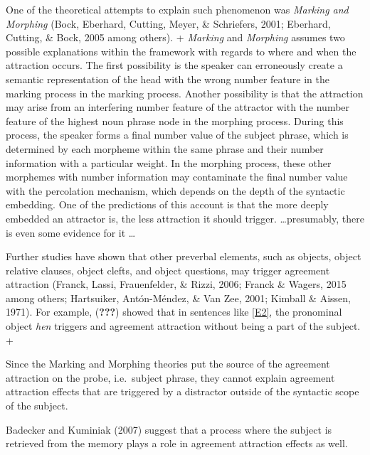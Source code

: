 \documentclass[english,doc]{apa6}
\begin{document}
One of the theoretical attempts to explain such phenomenon was \emph{Marking and Morphing} (Bock, Eberhard, Cutting, Meyer, \& Schriefers, 2001; Eberhard, Cutting, \& Bock, 2005 among others).
+
\emph{Marking} and \emph{Morphing} assumes two possible explanations within the framework with regards to where and when the attraction occurs. The first possibility is the speaker can erroneously create a semantic representation of the head with the wrong number feature in the marking process in the marking process. Another possibility is that the attraction may arise from an interfering number feature of the attractor with the number feature of the highest noun phrase node in the morphing process. During this process, the speaker forms a final number value of the subject phrase, which is determined by each morpheme within the same phrase and their number information with a particular weight. In the morphing process, these other morphemes with number information may contaminate the final number value with the percolation mechanism, which depends on the depth of the syntactic embedding. One of the predictions of this account is that the more deeply embedded an attractor is, the less attraction it should trigger. \ldots presumably, there is even some evidence for it \ldots 

Further studies have shown that other preverbal elements, such as objects, object relative clauses, object clefts, and object questions, may trigger agreement attraction (Franck, Lassi, Frauenfelder, \& Rizzi, 2006; Franck \& Wagers, 2015 among others; Hartsuiker, Antón-Méndez, \& Van Zee, 2001; Kimball \& Aissen, 1971). For example, ({\textbf{???}}) showed that in sentences like \autoref{E2}, the pronominal object \emph{hen} triggers and agreement attraction without being a part of the subject.
+

\begin{exe}
\label{E2}
\end{exe}

Since the Marking and Morphing theories put the source of the agreement attraction on the probe, i.e.~subject phrase, they cannot explain agreement attraction effects that are triggered by a distractor outside of the syntactic scope of the subject.

Badecker and Kuminiak (2007) suggest that a process where the subject is retrieved from the memory plays a role in agreement attraction effects as well.
\end{document}
